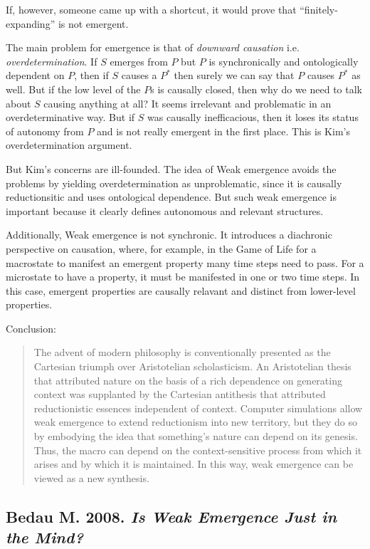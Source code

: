 \documentclass{article}
\newcommand{\ti}[1]{\textit{#1}}
\newcommand{\annbibtitle}[2]{\subsection*{#1. \ti{#2}}}
\begin{document}
If, however, someone came up with a shortcut, it would prove that ``finitely-expanding'' is not emergent.

The main problem for emergence is that of \ti{downward causation} i.e. \ti{overdetermination}. If $S$ emerges from $P$ but $P$ is synchronically and ontologically dependent on $P$, then if $S$ causes a $P^*$ then surely we can say that $P$ causes $P^*$ as well. But if the low level of the $P$s is causally closed, then why do we need to talk about $S$ causing anything at all? It seems irrelevant and problematic in an overdeterminative way. But if $S$ was causally inefficacious, then it loses its status of autonomy from $P$ and is not really emergent in the first place. This is Kim's overdetermination argument.

But Kim's concerns are ill-founded. The idea of Weak emergence avoids the problems by yielding overdetermination as unproblematic, since it is causally reductionsitic and uses ontological dependence. But such weak emergence is important because it clearly defines autonomous and relevant structures.

Additionally, Weak emergence is not synchronic. It introduces a diachronic perspective on causation, where, for example, in the Game of Life for a macrostate to manifest an emergent property many time steps need to pass. For a microstate to have a property, it must be manifested in one or two time steps. In this case, emergent properties are causally relavant and distinct from lower-level properties.

Conclusion:
\begin{quote}
The advent of modern philosophy is conventionally presented as the Cartesian triumph over Aristotelian scholasticism. An Aristotelian thesis that attributed nature on the basis of a rich dependence on generating context was supplanted by the Cartesian antithesis that attributed reductionistic essences independent of context. Computer simulations allow weak emergence to extend reductionism into new territory, but they do so by embodying the idea that something's nature can depend on its genesis. Thus, the macro can depend on the context-sensitive process from which it arises and by which it is maintained. In this way, weak emergence can be viewed as a new synthesis.
\end{quote}

\annbibtitle{Bedau M. 2008}{Is Weak Emergence Just in the Mind?}
\end{document}
